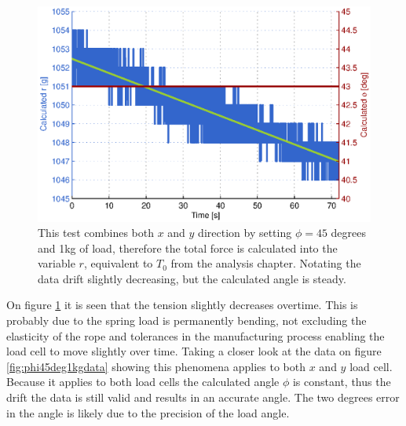 \begin{figure}[hbtp]
\centering
\includegraphics[scale=0.8]{graphics/gcs_test/phi45deg1kg.eps}
\caption[Test of calculating the horizontal angle]{This test combines both $x$ and $y$ direction by setting $\phi=45$ degrees and 1kg of load, therefore the total force is calculated into the variable $r$, equivalent to $T_0$ from the analysis chapter. Notating the data drift slightly decreasing, but the calculated angle is steady. }
\label{fig:phi45deg1kg}
\end{figure}

\newpage
\noindent
On figure \ref{fig:phi45deg1kg} it is seen that the tension slightly decreases overtime. This is probably due to the spring load is permanently bending, not excluding the elasticity of the rope and tolerances in the manufacturing process enabling the load cell to move slightly over time. Taking a closer look at the data on figure \ref{fig:phi45deg1kgdata} showing this phenomena applies to both $x$ and $y$ load cell. Because it applies to both load cells the calculated angle $\phi$ is constant, thus the drift the data is still valid and results in an accurate angle. The two degrees error in the angle is likely due to the precision of the load angle.

